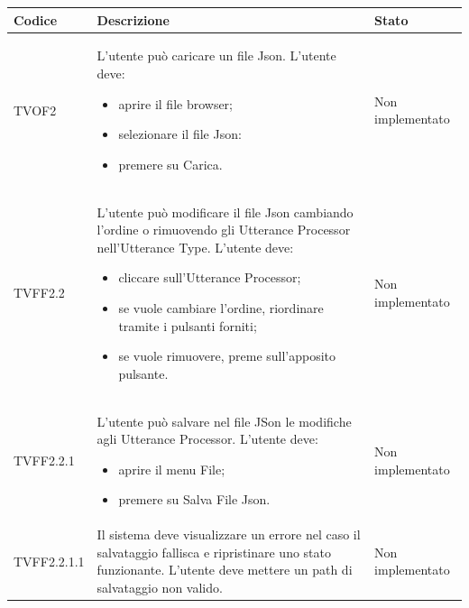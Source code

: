 \documentclass[openany,12pt,a4paper]{report}
\begin{document}
\begin{longtable}{| p{2cm} |p{5cm} | p{2.5cm} |}
	\hline
	\textbf{Codice} & \textbf{Descrizione} & \textbf{Stato}\\
	\hline
	\endhead
	
	\newline TVOF2&
	\newline L'utente può caricare un file Json. L'utente deve:
	\begin{itemize}
		\item aprire il file browser;
		\item selezionare il file Json:
		\item premere su Carica.
	\end{itemize}&
	\newline Non implementato
	\\[1em]	
	\hline	
	
	\newline TVFF2.2&
	\newline L'utente può modificare il file Json cambiando l'ordine o rimuovendo gli Utterance Processor nell'Utterance Type. L'utente deve:
	\begin{itemize}
		\item cliccare sull'Utterance Processor;
		\item se vuole cambiare l'ordine, riordinare tramite i pulsanti forniti;
		\item se vuole rimuovere, preme sull'apposito pulsante. 
	\end{itemize}&
	\newline Non implementato
	\\[1em]	
	\hline
	
	\newline TVFF2.2.1&
	\newline L'utente può salvare nel file JSon le modifiche agli Utterance Processor. L'utente deve:
	\begin{itemize}
		\item aprire il menu File;
		\item premere su Salva File Json.
	\end{itemize}&
	\newline Non implementato
	\\[1em]	
	\hline
	
	\newline TVFF2.2.1.1&
	\newline Il sistema deve visualizzare un errore nel caso il salvataggio fallisca e ripristinare uno stato funzionante. L'utente deve mettere un path di salvataggio non valido.&
	\newline Non implementato
	\\[1em]	
	\hline
	

\end{longtable}
\end{document}
